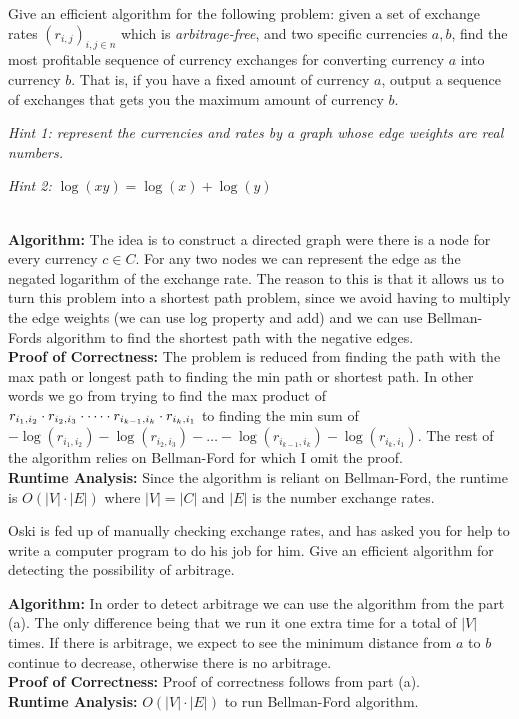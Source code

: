 \documentclass[10.5pt]{article}
\begin{document}
\begin{subparts}

\subpart
  Give an efficient algorithm for the following problem: given a set of exchange
  rates $(r_{i,j})_{i, j \in n}$ which is \emph{arbitrage-free},
  and two specific currencies $a,b$, find the most profitable
  sequence of currency exchanges for converting currency $a$ into currency $b$. That is, if you have a fixed amount of currency $a$, output a sequence of exchanges that gets you the maximum amount of currency $b$. 
  
  \textit{Hint 1: represent the currencies and rates by a graph whose edge weights are real numbers.}

  \textit{Hint 2: $\log(xy) = \log(x) + \log(y)$}\\
  \begin{solution}\\
    \textbf{Algorithm:}
    The idea is to construct a directed graph were there is a node for every currency $c \in C$. For any two
    nodes we can represent the edge as the negated logarithm of the exchange rate. The reason to this 
    is that it allows us to turn this problem into a shortest path problem, since we avoid having to multiply the edge weights (we can use log property and add) and we can use Bellman-Fords
    algorithm to find the shortest path with the negative edges.\\
    \textbf{Proof of Correctness:}
    The problem is reduced from finding the path with the max path or longest path to finding the min path or shortest path. In other words we go from
    trying to find the max product of $r_{i_1,i_2} \cdot r_{i_2,i_3\\} \cdot \dots \cdot r_{i_{k-1},i_k} \cdot r_{i_k,i_1}$ to finding the
    min sum of $-\log(r_{i_1,i_2})-\log(r_{i_2,i_3}) - \dots - \log(r_{i_{k-1},i_k}) - \log(r_{i_k,i_1})$. The rest of the algorithm relies on 
    Bellman-Ford for which I omit the proof.\\
    \textbf{Runtime Analysis: } Since the algorithm is reliant on Bellman-Ford, the runtime is $O(|V|\cdot|E|)$ where $|V| = |C|$ and $|E|$ is the number exchange rates.
\end{solution}

\subpart
  Oski is fed up of manually checking exchange rates, and has asked you for
  help to write a computer program to do his job for him.
  Give an efficient algorithm for detecting the possibility of arbitrage.
  \begin{solution}
    \textbf{Algorithm: } In order to detect arbitrage we can use the algorithm from the part (a). The only difference being that we run it 
    one extra time for a total of $|V|$ times. If there is arbitrage, we expect to see the minimum distance from $a$ to $b$ continue to decrease, otherwise there
    is no arbitrage.\\
    \textbf{Proof of Correctness:} Proof of correctness follows from part (a).\\
    \textbf{Runtime Analysis: } $O(|V|\cdot|E|)$ to run Bellman-Ford algorithm.
  \end{solution}

\end{subparts}
\end{document}
